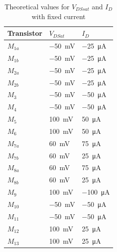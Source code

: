 \begin{table}[H]
    \centering
    \caption{Theoretical values for $V_{DSsat}$ and $I_D$ with fixed current}
    \begin{tabularx}{\textwidth}{>{\centering\arraybackslash}X >{\centering\arraybackslash}X >{\centering\arraybackslash}X}
        \toprule
        \textbf{Transistor} & \textbf{$V_{DSat}$} & \textbf{$I_D$}\\
        \midrule
        $M_{1a}$ & \SI{-50}{\milli\volt} & \SI{-25}{\micro\ampere}\\
        \midrule
        $M_{1b}$ & \SI{-50}{\milli\volt} & \SI{-25}{\micro\ampere}\\
        \midrule
        $M_{2a}$ & \SI{-50}{\milli\volt} & \SI{-25}{\micro\ampere}\\
        \midrule
        $M_{2b}$ & \SI{-50}{\milli\volt} & \SI{-25}{\micro\ampere}\\
        \midrule
        $M_{3}$ & \SI{-50}{\milli\volt} & \SI{-50}{\micro\ampere}\\
        \midrule
        $M_{4}$ & \SI{-50}{\milli\volt} & \SI{-50}{\micro\ampere}\\
        \midrule
        $M_{5}$ & \SI{100}{\milli\volt} & \SI{50}{\micro\ampere}\\
        \midrule
        $M_{6}$ & \SI{100}{\milli\volt} & \SI{50}{\micro\ampere}\\
        \midrule
        $M_{7a}$ & \SI{60}{\milli\volt} & \SI{75}{\micro\ampere}\\
        \midrule
        $M_{7b}$ & \SI{60}{\milli\volt} & \SI{25}{\micro\ampere}\\
        \midrule
        $M_{8a}$ & \SI{60}{\milli\volt} & \SI{75}{\micro\ampere}\\
        \midrule
        $M_{8b}$ & \SI{60}{\milli\volt} & \SI{25}{\micro\ampere}\\
        \midrule
        $M_{9}$ & \SI{100}{\milli\volt} & \SI{-100}{\micro\ampere}\\
        \midrule
        $M_{10}$ & \SI{-50}{\milli\volt} & \SI{-50}{\micro\ampere}\\
        \midrule
        $M_{11}$ & \SI{-50}{\milli\volt} & \SI{-50}{\micro\ampere}\\
        \midrule
        $M_{12}$ & \SI{100}{\milli\volt} & \SI{25}{\micro\ampere}\\
        \midrule
        $M_{13}$ & \SI{100}{\milli\volt} & \SI{25}{\micro\ampere}\\
        \bottomrule
    \end{tabularx}
    \label{tab:TeoVDSsatIdFix}
\end{table}


